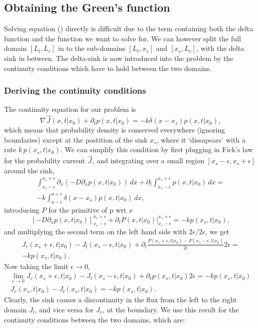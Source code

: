 \subsection{Obtaining the Green's function}

Solving equation () directly is difficult due to the term containing both the delta function and the function we want to solve for. We can however split the full domain $[L_l,L_r]$ in to the sub-domains $[L_l,x_s]$ and $[x_s,L_r]$, with the delta sink in between. The delta-sink is now introduced into the problem by the continuity conditions which have to hold between the two domains. 

\subsubsection{Deriving the continuity conditions}

The continuity equation for our problem is
\begin{equation}
 \nabla \vec{J}(x,t|x_0) + \partial_t p(x,t|x_0) = -k \delta( x - x_s ) p(x,t|x_0),
\end{equation}
which means that probability density is conserved everywhere (ignoring boundaries) except at the postition of the sink $x_s$, where it `dissapears' with a rate $k\,p(x_s,t|x_0)$. We can simplify this condition by first plugging in Fick's law for the probability current $\vec{J}$, and integrating over a small region $[x_s - \epsilon,x_s + \epsilon]$ around the sink, 
\setlength{\jot}{10pt}
\begin{gather}
\int_{x_s - \epsilon}^{x_s + \epsilon} \partial_x \left( -D \partial_x p(x,t|x_0)  \right) \, dx + \partial_t \int_{x_s - \epsilon}^{x_s + \epsilon} p(x,t|x_0) \, dx = \nonumber \\
-k \int_{a - \epsilon}^{a + \epsilon} \delta( x - x_s ) p(x,t|x_0) \, dx, \nonumber
\end{gather}
introducing $P$ for the primitive of p wrt $x$
\begin{equation}
\left[ -D \partial_x p(x,t|x_0)  \right]_{x_s - \epsilon}^{x_s + \epsilon} + \partial_t \left. P(x,t|x_0) \right|_{x_s - \epsilon}^{x_s + \epsilon} = -k p(x_s,t|x_0) \nonumber,
\end{equation}
and multiplying the second term on the left hand side with $2\epsilon/2\epsilon$, we get
\begin{gather}
J_r(x_s + \epsilon,t|x_0) - J_l(x_s - \epsilon,t|x_0) + \partial_t \frac{P(x_s + \epsilon,t|x_0) - P(x_s - \epsilon,t|x_0)}{2 \epsilon} 2\epsilon = \nonumber \\ 
-k p(x_s,t|x_0). \nonumber
\end{gather}
Now taking the limit $\epsilon \rightarrow 0$,
\begin{gather}
 \lim_{\epsilon \to 0} J_r(x_s + \epsilon,t|x_0) - J_l(x_s - \epsilon,t|x_0) + \partial_t p(x_s,t|x_0) 2\epsilon = -k p(x_s,t|x_0) \nonumber \\
 J_r(x_s,t|x_0) - J_l(x_s,t|x_0) = -k p(x_s,t|x_0).
\end{gather}
Clearly, the sink causes a discontinuity in the flux from the left to the right domain $J_l$, and vice versa for $J_r$, at the boundary. We use this result for the continuity conditions between the two domains, which are:

